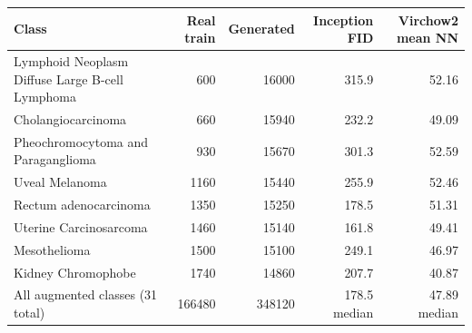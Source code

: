 \begin{tabular}{lrrrr}
\toprule
Class & Real train & Generated & Inception FID & Virchow2 mean NN\\
\midrule
Lymphoid Neoplasm Diffuse Large B-cell Lymphoma & 600 & 16000 & 315.9 & 52.16\\
Cholangiocarcinoma & 660 & 15940 & 232.2 & 49.09\\
Pheochromocytoma and Paraganglioma & 930 & 15670 & 301.3 & 52.59\\
Uveal Melanoma & 1160 & 15440 & 255.9 & 52.46\\
Rectum adenocarcinoma & 1350 & 15250 & 178.5 & 51.31\\
Uterine Carcinosarcoma & 1460 & 15140 & 161.8 & 49.41\\
Mesothelioma & 1500 & 15100 & 249.1 & 46.97\\
Kidney Chromophobe & 1740 & 14860 & 207.7 & 40.87\\
\midrule
All augmented classes (31 total) & 166480 & 348120 & 178.5 median & 47.89 median\\
\bottomrule
\end{tabular}
